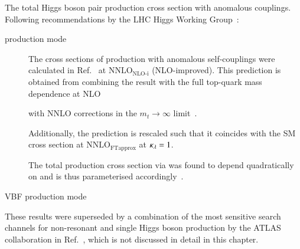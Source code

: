 The total Higgs boson pair production cross section with anomalous
couplings. Following recommendations by the LHC Higgs Working
Group~\cite{LHCHWGHH}:
\begin{description}

\item[\ggF production mode] The cross sections of \HH production with
  anomalous self-couplings were calculated in
  Ref.~\cite{Amoroso:2020lgh} at $\text{NNLO}_{\text{NLO-i}}$
  (NLO-improved). This prediction is obtained from combining the
  result with the full top-quark mass dependence at
  NLO~\cite{Buchalla:2018yce}


  with NNLO corrections in the $m_{t} \to \infty$
  limit~\cite{deFlorian:2017qfk}.

  Additionally, the prediction is rescaled such that it coincides with
  the SM \HH cross section at $\text{NNLO}_{\text{FTapprox}}$ at
  $\kappa_{\lambda} = 1$.

  The total \HH production cross section via \ggF was found to depend
  quadratically on \klambda and is thus parameterised
  accordingly~\cite{LHCHWGHH}.

\item[VBF production mode]

\end{description}




These results were superseded by a combination of the most sensitive
search channels for non-resonant \HH and single Higgs boson production
by the ATLAS collaboration in Ref.~\cite{ATLAS-CONF-2022-050}, which
is not discussed in detail in this chapter.


